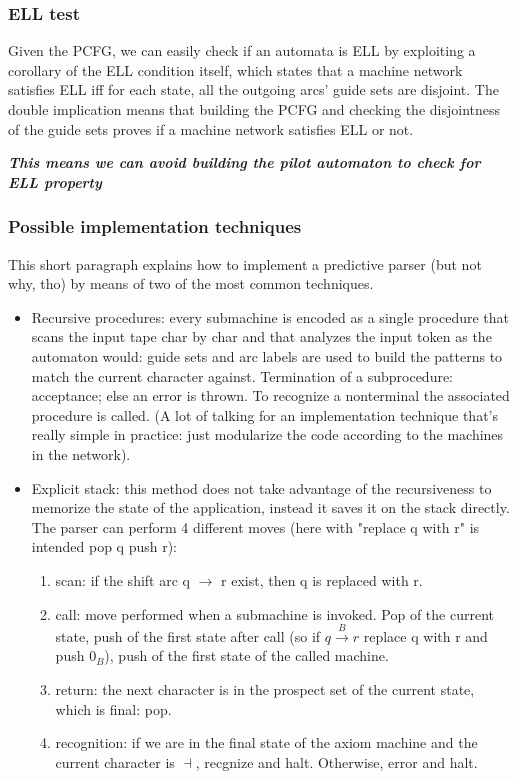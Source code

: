 			\subsubsection{ELL test}
				Given the PCFG, we can easily check if an automata is ELL by exploiting a corollary of the ELL condition itself, which states that a machine network 
				satisfies ELL iff for each state, all the outgoing arcs' guide sets are disjoint. The double implication means that building the PCFG and checking 
				the disjointness of the guide sets proves if a machine network satisfies ELL or not.

				\emph{\textbf{This means we can avoid building the pilot automaton to check for ELL property}}
				
			\subsubsection{Possible implementation techniques}
				This short paragraph explains how to implement a predictive parser (but not why, tho) by means of two of the most common techniques.
				\begin{itemize}
					\item Recursive procedures: every submachine is encoded as a single procedure that scans the input tape char by char and that analyzes the input 
					token as the automaton would: guide sets and arc labels are used to build the patterns to match the current character against. Termination of a 
					subprocedure: acceptance; else an error is thrown. To recognize a nonterminal the associated procedure is called. (A lot of talking for an 
					implementation technique that's really simple in practice: just modularize the code according to the machines in the network).
					\item Explicit stack: this method does not take advantage of the recursiveness to memorize the state of the application, instead it saves it on 
					the stack directly. The parser can perform 4 different moves (here with "replace q with r" is intended pop q push r):
						\begin{enumerate}
							\item scan: if the shift arc q $\rightarrow$ r exist, then q is replaced with r.
							\item call: move performed when a submachine is invoked. Pop of the current state, push of the first state after call (so if 
							$q \xrightarrow{B} r$ replace q with r and push $0_B$), push of the first state of the called machine.
							\item return: the next character is in the prospect set of the current state, which is final: pop.
							\item recognition: if we are in the final state of the axiom machine and the current character is $\dashv$, recgnize and halt. Otherwise, 
							error and halt.
						\end{enumerate}
				\end{itemize}
				
